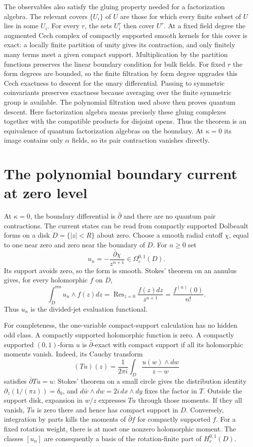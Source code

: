 The observables also satisfy the gluing property needed for a
factorization algebra.  The relevant covers $\{U_i\}$ of $U$ are
those for which every finite subset of $U$ lies in some $U_i$.
For every $r$, the sets $U_i^r$ then cover $U^r$.
At a fixed field degree the augmented Cech complex of compactly
supported smooth kernels for this cover is exact: a locally finite
partition of unity gives its contraction, and only finitely many
terms meet a given compact support.  Multiplication by the partition
functions preserves the linear boundary condition for bulk fields.
For fixed $r$ the form degrees are bounded, so the finite filtration
by form degree upgrades this Cech exactness to descent for the unary
differential.  Passing to symmetric coinvariants preserves exactness
because averaging over the finite symmetric group is available.
The polynomial filtration used above then proves quantum descent.
Here factorization algebra means precisely these gluing complexes
together with the compatible products for disjoint opens.
Thus the theorem is an equivalence of quantum factorization algebras
on the boundary.  At $\kappa=0$ its image contains only $\alpha$
fields, so its pair contraction vanishes directly.

\section{The polynomial boundary current at zero level}

At $\kappa=0$, the boundary differential is $\bar\partial$ and
there are no quantum pair contractions.  The current states can be
read from compactly supported Dolbeault forms on a disk
$D=\{|z|<R\}$ about zero.  Choose a smooth radial cutoff $\chi$, equal to one near zero and
zero near the boundary of $D$.  For $n\ge0$ set
\[
 u_n=-\frac{\bar\partial\chi}{z^{n+1}}\in\Omega_c^{0,1}(D).
\]
Its support avoids zero, so the form is smooth.  Stokes' theorem on
an annulus gives, for every holomorphic $f$ on $D$,
\[
 \int_D^{\mathrm{res}}u_n\wedge f(z)dz
       =\operatorname{Res}_{z=0}\frac{f(z)dz}{z^{n+1}}
       =\frac{f^{(n)}(0)}{n!}.
\]
Thus $u_n$ is the divided-jet evaluation functional.

For completeness, the one-variable compact-support calculation has
no hidden odd class.  A compactly supported holomorphic function is
zero.  A compactly supported $(0,1)$-form $u$ is $\bar\partial$-exact
with compact support if all its holomorphic moments vanish.  Indeed,
its Cauchy transform
\[
 (Tu)(z)=\frac1{2\pi i}\int_D
                   \frac{u(w)\wedge dw}{z-w}
\]
satisfies $\bar\partial Tu=u$: Stokes' theorem on a small circle
gives the distribution identity
$\partial_{\bar z}(1/(\pi z))=\delta_0$, and $d\bar w\wedge dw=2i\,dx\wedge dy$ fixes the factor in $T$.
Outside the support disk, expansion
in $w/z$ expresses $Tu$ through those moments.  If they all vanish,
$Tu$ is zero there and hence has compact support in $D$.
Conversely, integration by parts kills the moments of
$\bar\partial f$ for compactly supported $f$.
For a fixed rotation weight, there is at most one nonzero holomorphic
moment.  The classes $[u_n]$ are consequently a basis of the
rotation-finite part of $H_c^{0,1}(D)$.

